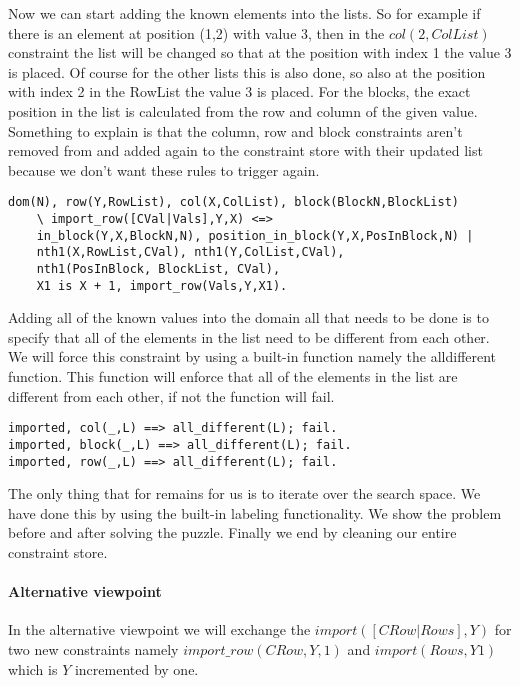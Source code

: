 Now we can start adding the known elements into the lists.
So for example if there is an element at position (1,2) with value 3, then in the $col(2,ColList)$ constraint the list will be changed so that at the position with index 1 the value 3 is placed.
Of course for the other lists this is also done, so also at the position with index 2 in the RowList the value 3 is placed.
For the blocks, the exact position in the list is calculated from the row and column of the given value.
Something to explain is that the column, row and block constraints aren't removed from and added again to the constraint store with their updated list because we don't want these rules to trigger again.

\begin{lstlisting}
dom(N), row(Y,RowList), col(X,ColList), block(BlockN,BlockList) 
	\ import_row([CVal|Vals],Y,X) <=>
	in_block(Y,X,BlockN,N), position_in_block(Y,X,PosInBlock,N) | 
	nth1(X,RowList,CVal), nth1(Y,ColList,CVal), 
	nth1(PosInBlock, BlockList, CVal), 
	X1 is X + 1, import_row(Vals,Y,X1).
\end{lstlisting}

Adding all of the known values into the domain all that needs to be done is to specify that all of the elements in the list need to be different from each other.
We will force this constraint by using a built-in function namely the alldifferent function.
This function will enforce that all of the elements in the list are different from each other, if not the function will fail.

\begin{lstlisting}
imported, col(_,L) ==> all_different(L); fail.
imported, block(_,L) ==> all_different(L); fail.
imported, row(_,L) ==> all_different(L); fail.
\end{lstlisting}

The only thing that for remains for us is to iterate over the search space. We have done this by using the built-in labeling functionality. We show the problem before and after solving the puzzle.
Finally we end by cleaning our entire constraint store.

\paragraph*{Alternative viewpoint}
In the alternative viewpoint we will exchange the \texttt{$import([CRow|Rows],Y)$} for two new constraints namely \texttt{$import\_row(CRow,Y,1)$} and \texttt{$import(Rows,Y1)$} which is $Y$ incremented by one.

